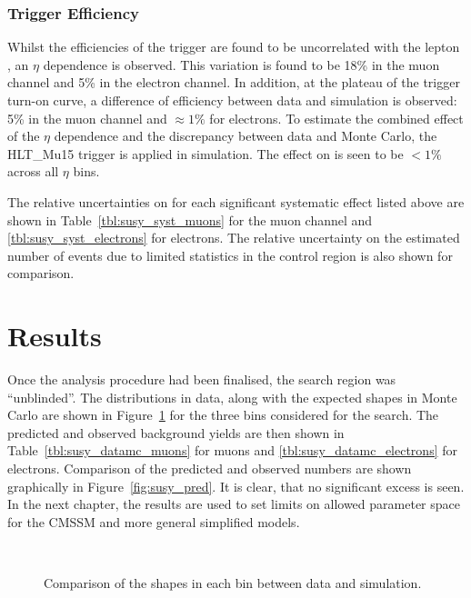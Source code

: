 \subsubsection{Trigger Efficiency}
Whilst the efficiencies of the trigger are found to be uncorrelated with the
lepton \Pt, an $\eta$ dependence is observed. This variation is found to be 18\%
in the muon channel and 5\% in the electron channel. In addition, at the plateau
of the trigger turn-on curve, a difference of efficiency between data and
simulation is observed: 5\% in the muon channel and $\approx 1\%$ for
electrons. To estimate the combined effect of the $\eta$ dependence and the
discrepancy between data and Monte Carlo, the HLT\_Mu15 trigger is applied in
simulation. The effect on \RCS is seen to be $<1\%$ across all $\eta$ bins.

The relative uncertainties on \RCS for each significant systematic effect listed
above are shown in Table~\ref{tbl:susy_syst_muons} for the muon channel and
\ref{tbl:susy_syst_electrons} for electrons. The relative uncertainty on the
estimated number of events due to limited statistics in the control region is
also shown for comparison.




\section{Results}
Once the analysis procedure had been finalised, the search region was
``unblinded''. The \LP distributions in data, along with the expected shapes in
Monte Carlo are shown in Figure~\ref{fig:susy_datamc} for the three \STlep bins
considered for the search. The predicted and observed background yields are then
shown in Table~\ref{tbl:susy_datamc_muons} for muons and
\ref{tbl:susy_datamc_electrons} for electrons. Comparison of the predicted and
observed numbers are shown graphically in Figure~\ref{fig:susy_pred}. It is
clear, that no significant excess is seen. In the next chapter, the results are
used to set limits on allowed parameter space for the \ac{CMSSM} and more
general simplified models.

\begin{figure}
\centering
{}\quad
{}\quad
{}\\
\quad
{}\quad
{}
\caption[]{Comparison of the \LP shapes in each \STlep bin between data and simulation.}
\label{fig:susy_datamc}
\end{figure}

